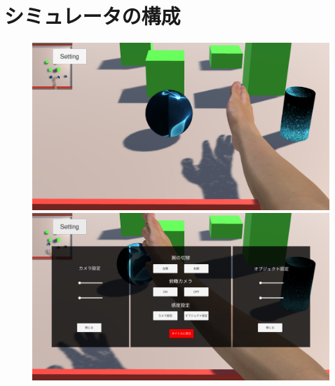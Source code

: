 \documentclass{ltjsreport}
\begin{document}
	\section{シミュレータの構成}

		\begin{figure}[H]
		\centering
		\begin{minipage}{0.4\columnwidth}
		\centering
		\includegraphics[width = \columnwidth]{../figs/PCnomal.png}
		\end{minipage}
		\hspace{0.04\columnwidth}
		\begin{minipage}{0.4\columnwidth}
		\centering
		\includegraphics[width = \columnwidth]{../figs/PCmenu.png}
		\end{minipage}
		\caption{}
		\end{figure}
\end{document}
